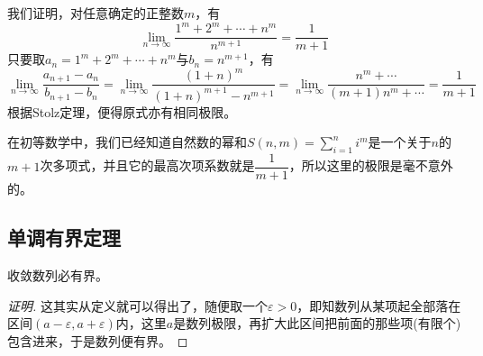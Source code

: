 \begin{example}
  我们证明，对任意确定的正整数$m$，有
  \[ \lim_{n \to \infty} \frac{1^m+2^m+\cdots+n^m}{n^{m+1}} = \frac{1}{m+1} \]
  只要取$a_n=1^m+2^m+\cdots+n^m$与$b_n=n^{m+1}$，有
  \[ \lim_{n \to \infty} \frac{a_{n+1}-a_n}{b_{n+1}-b_n} = \lim_{n \to \infty} \frac{(1+n)^m}{(1+n)^{m+1}-n^{m+1}} = \lim_{n \to \infty} \frac{n^m+\cdots}{(m+1)n^m+\cdots} = \frac{1}{m+1} \]
  根据Stolz定理，便得原式亦有相同极限。

  在初等数学中，我们已经知道自然数的幂和$S(n,m)=\sum\limits_{i=1}^ni^m$是一个关于$n$的$m+1$次多项式，并且它的最高次项系数就是$\dfrac{1}{m+1}$，所以这里的极限是毫不意外的。
\end{example}


\subsection{单调有界定理}
\label{sec:theorem-of-monotone-bounded}

\begin{theorem}[收敛数列的有界性]
  收敛数列必有界。
\end{theorem}

\begin{proof}[证明]
  这其实从定义就可以得出了，随便取一个$\varepsilon>0$，即知数列从某项起全部落在区间$(a-\varepsilon, a+\varepsilon)$内，这里$a$是数列极限，再扩大此区间把前面的那些项(有限个)包含进来，于是数列便有界。
\end{proof}

